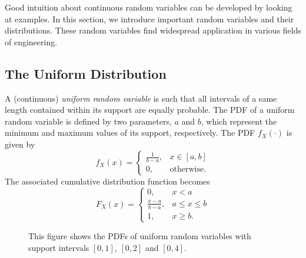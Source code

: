 Good intuition about continuous random variables can be developed by looking at examples.
In this section, we introduce important random variables and their distributions.
These random variables find widespread application in various fields of engineering.


\subsection{The Uniform Distribution}

A (continuous) \emph{uniform random variable} is such that all intervals of a same length contained within its support are equally probable. 
The PDF of a uniform random variable is defined by two parameters, $a$ and $b$, which represent the minimum and maximum values of its support, respectively.
The PDF $f_X(\cdot)$ is given by
\begin{equation*}
f_X(x) = \begin{cases} \frac{1}{b-a}, & x \in [a, b] \\
0, & \text{otherwise}. \end{cases}
\end{equation*}
The associated cumulative distribution function becomes
\begin{equation*}
F_X(x) = \begin{cases} 0, & x < a \\
\frac{x-a}{b-a}, & a \leq x \leq b \\
1, & x \geq b . \end{cases}
\end{equation*}

\begin{figure}[ht]
\begin{center}
\end{center}
\caption{This figure shows the PDFs of uniform random variables with support intervals $[0,1]$, $[0,2]$ and $[0,4]$.}
\end{figure}

